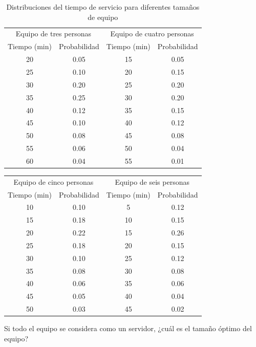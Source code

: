 \documentclass[11pt,letterpaper]{report}
\begin{document}
\begin{table}[H]
\centering
\caption*{Distribuciones del tiempo de servicio para diferentes tamaños de equipo}
\begin{tabular}{cccc}
\toprule
\multicolumn{2}{c}{Equipo de tres personas} & \multicolumn{2}{c}{Equipo de cuatro personas} \\
Tiempo (min) & Probabilidad & Tiempo (min) & Probabilidad \\
\midrule
20 & 0.05 & 15 & 0.05 \\
25 & 0.10 & 20 & 0.15 \\
30 & 0.20 & 25 & 0.20 \\
35 & 0.25 & 30 & 0.20 \\
40 & 0.12 & 35 & 0.15 \\
45 & 0.10 & 40 & 0.12 \\
50 & 0.08 & 45 & 0.08 \\
55 & 0.06 & 50 & 0.04 \\
60 & 0.04 & 55 & 0.01 \\
\bottomrule
\end{tabular}
\end{table}

\begin{table}[H]
\centering
\begin{tabular}{cccc}
\toprule
\multicolumn{2}{c}{Equipo de cinco personas} & \multicolumn{2}{c}{Equipo de seis personas} \\
Tiempo (min) & Probabilidad & Tiempo (min) & Probabilidad \\
\midrule
10 & 0.10 & 5  & 0.12 \\
15 & 0.18 & 10 & 0.15 \\
20 & 0.22 & 15 & 0.26 \\
25 & 0.18 & 20 & 0.15 \\
30 & 0.10 & 25 & 0.12 \\
35 & 0.08 & 30 & 0.08 \\
40 & 0.06 & 35 & 0.06 \\
45 & 0.05 & 40 & 0.04 \\
50 & 0.03 & 45 & 0.02 \\
\bottomrule
\end{tabular}
\end{table}

Si todo el equipo se considera como un servidor, ¿cuál es el tamaño óptimo
del equipo?
\end{document}
